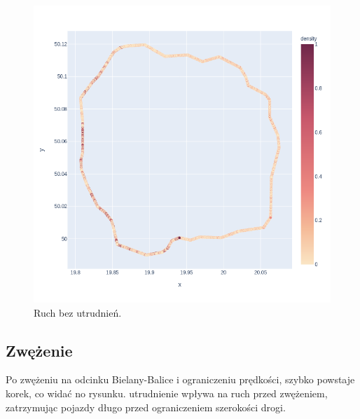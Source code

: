 \documentclass[a4paper,12pt]{article}
\begin{document}
    \begin{figure}[H]
    	\centering
    	\includegraphics[height=0.4\textheight,width=\linewidth]{img/note-sim.png}
    	\caption{Ruch bez utrudnień.}
    \end{figure}
    
    \subsection{Zwężenie}
    Po zwężeniu na odcinku Bielany-Balice i ograniczeniu prędkości, szybko powstaje korek, co widać no rysunku.
    utrudnienie wpływa na ruch przed zwężeniem, zatrzymując pojazdy długo przed ograniczeniem szerokości drogi.
    
\end{document}
